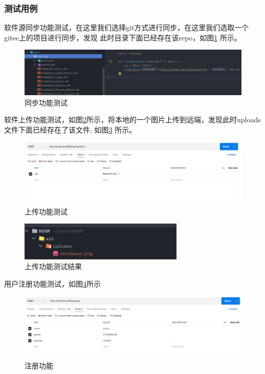 \documentclass[supercite]{Experimental_Report}
\theoremstyle{definition}
\begin{document}
\subsubsection{测试用例}
软件源同步功能测试，在这里我们选择git方式进行同步，在这里我们选取一个gitee上的项目进行同步，发现
此时目录下面已经存在该repo，如图\ref{sync-git} 所示。
\begin{figure}[!h]
    \centering
    \includegraphics[width=1\textwidth]{./images/git.png}
    \caption{同步功能测试}
    \label{sync-git}
\end{figure}

软件上传功能测试，如图\ref{upload}所示，将本地的一个图片上传到远端，发现此时uploads文件下面已经存在了该文件,
如图\ref{upload-res} 所示。
\begin{figure}[!h]
    \centering
    \includegraphics[width=1\textwidth]{./images/upload.png}
    \caption{上传功能测试}
    \label{upload}
\end{figure}
\newpage
\begin{figure}[!h]
    \centering
    \includegraphics[width=0.7\textwidth]{./images/upload-res.png}
    \caption{上传功能测试结果}
    \label{upload-res}
\end{figure}

用户注册功能测试，如图\ref{signup}所示
\begin{figure}[!h]
    \centering
    \includegraphics[width=1\textwidth]{./images/signup.png}
    \caption{注册功能}
    \label{signup}
\end{figure}
\end{document}
